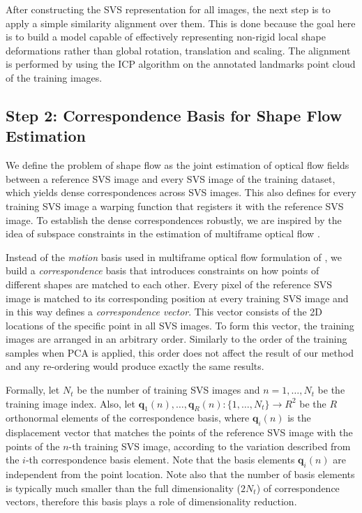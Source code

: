 After constructing the SVS representation for all images, the next step is to apply a simple similarity alignment over them. This is done because the goal here is to build a model capable of effectively representing non-rigid local shape deformations rather than global rotation, translation and scaling. The alignment is performed by using the ICP algorithm \cite{Besl1992} on the annotated landmarks point cloud of the training images.


{\label{sec:step2}\subsection*{Step 2: Correspondence Basis for Shape Flow Estimation}}

We define the problem of shape flow as the joint estimation of optical flow fields between a reference SVS image and every SVS image of the training dataset, which yields dense correspondences across SVS images. This also defines for every training SVS image a warping function that registers it with the reference SVS image. To establish the dense correspondences robustly, we are inspired by the idea of subspace constraints in the estimation of multiframe optical flow \cite{Garg:2013hu,tomasi2012dense,snape15faceflow}.

Instead of the \emph{motion} basis used in multiframe optical flow formulation of \cite{Garg:2013hu}, we build a \emph{correspondence} basis that introduces constraints on how points of different shapes are matched to each other. Every pixel of the reference SVS image is matched to its corresponding position at every training SVS image and in this way defines a \emph{correspondence vector}. This vector consists of the 2D locations of the specific point in all SVS images. To form this vector, the training images are arranged in an arbitrary order. Similarly to the order of the training samples when PCA is applied, this order does not affect the result of our method and any re-ordering would produce exactly the same results.


Formally, let $N_t$ be the number of training SVS images and $n=1,\dots,N_t$ be the training image index. Also, let $\bm{q}_1(n),\dots,\bm{q}_R(n):\{ 1,\dots,N_t \} \rightarrow R^2$ be the $R$ orthonormal elements of the correspondence basis, where $\bm{q}_i(n)$ is the displacement vector that matches the points of the reference SVS image with the points of the $n$-th training SVS image, according to the variation described from the $i$-th correspondence basis element. Note that the basis elements $\bm{q}_i(n)$ are independent from the point location. Note also that the number of basis elements is typically much smaller than the full dimensionality ($2 N_t$) of correspondence vectors, therefore this basis plays a role of dimensionality reduction. 

